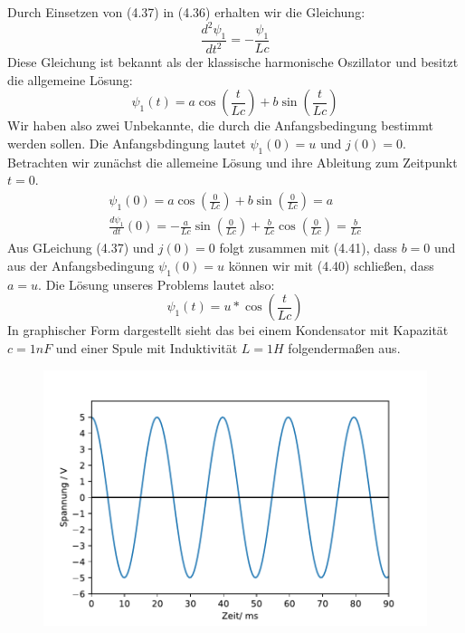 \documentclass[11pt,a4paper,leqno]{report}
\numberwithin{equation}{chapter}
\begin{document}
Durch Einsetzen von (4.37) in (4.36) erhalten wir die Gleichung:
\begin{equation}
	\frac{d^2\psi_1}{dt^2} = -\frac{\psi_1}{Lc}
\end{equation}
Diese Gleichung ist bekannt als der klassische harmonische Oszillator und besitzt die allgemeine L\"osung:
\begin{equation}
	\psi_1(t) = a \cos(\frac{t}{Lc}) + b \sin(\frac{t}{Lc})
\end{equation}
Wir haben also zwei Unbekannte, die durch die Anfangsbedingung bestimmt werden sollen. Die Anfangsbdingung lautet $\psi_1(0) = u$ und $j(0) = 0$. Betrachten wir zun\"achst die allemeine L\"osung und ihre Ableitung zum Zeitpunkt $t=0$.
 \begin{align} 
\psi_1(0) = a \cos(\frac{0}{Lc}) + b \sin(\frac{0}{Lc}) = a\\
\frac{d\psi_1}{dt}(0) = -\frac{a}{Lc} \sin(\frac{0}{Lc}) + \frac{b}{Lc} \cos(\frac{0}{Lc}) = \frac{b}{Lc}
\end{align}
Aus GLeichung (4.37) und $j(0) = 0$ folgt zusammen mit (4.41), dass $b=0$ und aus der Anfangsbedingung $\psi_1(0) = u$ k\"onnen wir mit (4.40) schlie\ss{}en, dass $a=u$. Die L\"osung unseres Problems lautet also:
\begin{equation}
	\psi_1(t) = u * \cos(\frac{t}{Lc})
\end{equation}
In graphischer Form dargestellt sieht das bei einem Kondensator mit Kapazit\"at $c=1nF$ und einer Spule mit Induktivit\"at $L=1H$ folgenderma\ss{}en aus.
  \begin{figure}[H]
	\begin{center}
		\includegraphics[scale=0.75]{harmonisch.pdf}
	\end{center}
\end{figure}
\end{document}
